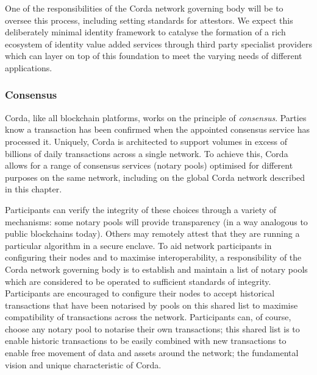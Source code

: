 \documentclass{article}
\begin{document}
One of the responsibilities of the Corda network governing body will be to oversee this process, including setting standards for attestors. We expect this deliberately minimal identity framework to catalyse the formation of a rich ecosystem of identity value added services through third party specialist providers which can layer on top of this foundation to meet the varying needs of different applications.

\subsubsection{Consensus}

Corda, like all blockchain platforms, works on the principle of \textit{consensus}. Parties know a transaction has been confirmed when the appointed consensus service has processed it. Uniquely, Corda is architected to support volumes in excess of billions of daily transactions across a single network. To achieve this, Corda allows for a range of consensus services (notary pools) optimised for different purposes on the same network, including on the global Corda network described in this chapter.



Participants can verify the integrity of these choices through a variety of mechanisms: some notary pools will provide transparency (in a way analogous to public blockchains today). Others may remotely attest that they are running a particular algorithm in a secure enclave. To aid network participants in configuring their nodes and to maximise interoperability, a responsibility of the Corda network governing body is to establish and maintain a list of notary pools which are considered to be operated to sufficient standards of integrity. Participants are encouraged to configure their nodes to accept historical transactions that have been notarised by pools on this shared list to maximise compatibility of transactions across the network. Participants can, of course, choose any notary pool to notarise their own transactions; this shared list is to enable historic transactions to be easily combined with new transactions to enable free movement of data and assets around the network; the fundamental vision and unique characteristic of Corda.
\end{document}
